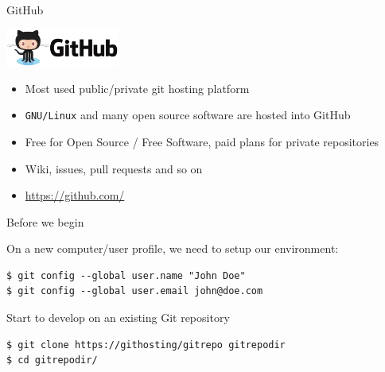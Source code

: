 \begin{frame}[fragile]{GitHub}

\includegraphics[width=10em]{github-logo}

\begin{itemize}
  \item Most used public/private git hosting platform
  \item \texttt{GNU/Linux} and many open source software are hosted into GitHub
  \item Free for Open Source / Free Software, paid plans for private repositories
  \item Wiki, issues, pull requests and so on
  \item[] \url{https://github.com/}
\end{itemize}
\end{frame}


\begin{frame}[c,fragile]{Before we begin}

On a new computer/user profile, we need to setup our environment:

\begin{center}
\begin{minipage}{\textwidth}

\begin{listing}[H]
\begin{verbatim}
$ git config --global user.name "John Doe"
$ git config --global user.email john@doe.com
\end{verbatim}
\end{listing}

\end{minipage}
\end{center}

\end{frame}


\begin{frame}[c,fragile]{Start to develop on an existing Git repository}

\begin{center}
\begin{minipage}{\textwidth}

\begin{listing}[H]
\begin{verbatim}
$ git clone https://githosting/gitrepo gitrepodir
$ cd gitrepodir/
\end{verbatim}
\end{listing}

\end{minipage}
\end{center}

\end{frame}


